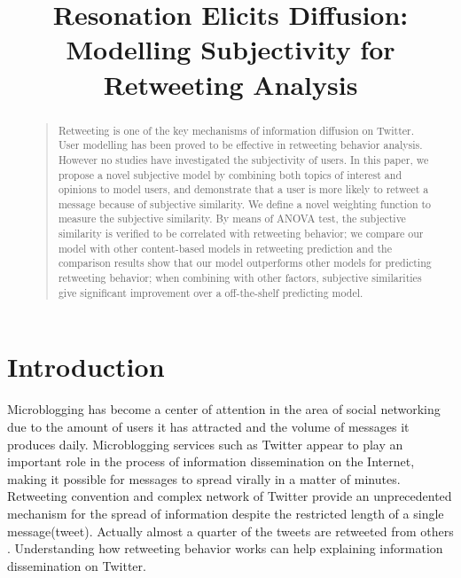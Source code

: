 \documentclass[letterpaper]{article}
\begin{document}
%
\title{Resonation Elicits Diffusion: \\Modelling Subjectivity for Retweeting Analysis}
\maketitle
\begin{abstract}
\begin{quote}
Retweeting is one of the key mechanisms of information diffusion on Twitter. User modelling has been proved to be effective in retweeting behavior analysis. However no studies have investigated the subjectivity of users. 
In this paper, we propose a novel subjective model by combining both topics of interest and opinions to model users, and demonstrate that a user is more likely to retweet a message because of subjective similarity. 
We define a novel weighting function to measure the subjective similarity. 
By means of ANOVA test, the subjective similarity is verified to be correlated with retweeting behavior;  
we compare our model with other content-based models in retweeting prediction and the comparison results show that our model outperforms other models for predicting retweeting behavior; 
when combining with other factors, subjective similarities give significant improvement over a off-the-shelf predicting model.
\end{quote}
\end{abstract}

\section{Introduction}
\label{introduction}
\noindent Microblogging has become a center of attention in the area of social networking due to the amount of users it has attracted and the volume of messages it produces daily. 
Microblogging services such as Twitter appear to play an important role in the process of information dissemination on the Internet, making it possible for messages to spread virally in a matter of minutes. 
Retweeting convention and complex network of Twitter provide an unprecedented mechanism for the spread of information despite the restricted length of a single message(tweet). 
Actually almost a quarter of the tweets are retweeted from others \cite{conf/cikm/YangGCTLZS10}. 
Understanding how retweeting behavior works can help explaining information dissemination on Twitter. 
\end{document}
